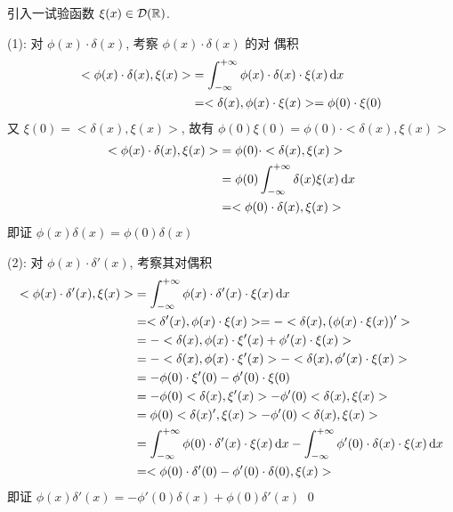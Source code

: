 \begin{solution}
引入一试验函数 $\xi(x) \in \mathcal D({\mathbb R})$.

\noindent (1): 对 $\phi(x) \cdot \delta(x)$, 考察 $\phi(x) \cdot \delta(x)$ 的对
偶积
\[ \begin{aligned}
<\phi(x) \cdot \delta(x), \xi(x)> &= \int_{-\infty}^{+\infty} 
    \phi(x) \cdot \delta(x) \cdot \xi(x) \operatorname{d\!} x \\
&= <\delta(x), \phi(x) \cdot \xi(x)> = \phi(0) \cdot \xi(0)
\end{aligned} \]
又 $\xi(0) = <\delta(x), \xi(x)>$, 故有
$\phi(0)\xi(0) = \phi(0) \cdot <\delta(x), \xi(x)>$
\[ \begin{aligned}
<\phi(x) \cdot \delta(x), \xi(x)> &= \phi(0) \cdot <\delta(x), \xi(x)> \\
&= \phi(0) \int_{-\infty}^{+\infty}\delta(x)\xi(x)\operatorname{d\!} x \\
&= <\phi(0) \cdot \delta(x), \xi(x)>
\end{aligned} \]
即证 $\phi(x)\delta(x) = \phi(0)\delta(x)$

\noindent (2): 对 $\phi(x) \cdot \delta'(x)$, 考察其对偶积
\[ \begin{aligned}
<\phi(x) \cdot \delta'(x), \xi(x)> &= \int_{-\infty}^{+\infty} 
    \phi(x) \cdot \delta'(x) \cdot \xi(x) \operatorname{d\!} x \\
&= <\delta'(x), \phi(x)\cdot\xi(x)> = -<\delta(x), (\phi(x)\cdot\xi(x))'> \\
&= -<\delta(x), \phi(x)\cdot\xi'(x) + \phi'(x)\cdot\xi(x)> \\
&= -<\delta(x), \phi(x)\cdot\xi'(x)> - <\delta(x), \phi'(x)\cdot\xi(x)> \\
&= -\phi(0)\cdot\xi'(0) - \phi'(0)\cdot\xi(0) \\
&= -\phi(0)<\delta(x), \xi'(x)> - \phi'(0)<\delta(x), \xi(x)> \\
&= \phi(0)<\delta(x)', \xi(x)> - \phi'(0)<\delta(x), \xi(x)> \\
&= \int_{-\infty}^{+\infty} \phi(0)\cdot\delta'(x)\cdot\xi(x) \operatorname{d\!} x
- \int_{-\infty}^{+\infty} \phi'(0)\cdot\delta(x)\cdot\xi(x) \operatorname{d\!} x \\
&= <\phi(0)\cdot\delta'(0) - \phi'(0)\cdot\delta(0), \xi(x)>
\end{aligned} \]
即证 $\phi(x)\delta'(x) = -\phi'(0)\delta(x) + \phi(0)\delta'(x)$
\qed
\end{solution}


